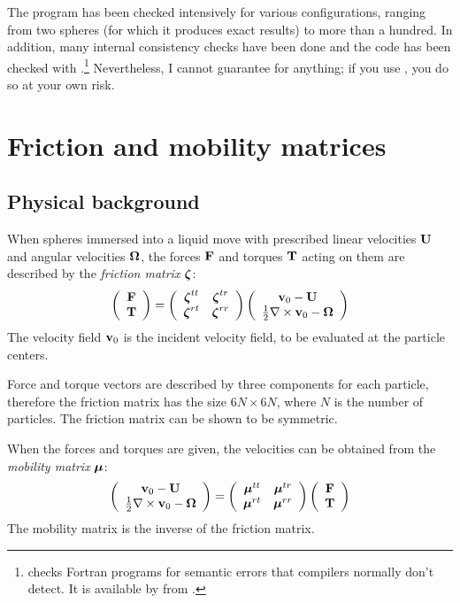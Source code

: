 The program has been checked intensively for various configurations,
ranging from two spheres (for which it produces exact results) to more
than a hundred. In addition, many internal consistency checks have
been done and the code has been checked with
.\footnote{ checks Fortran programs for
semantic errors that compilers normally don't detect. It is available
by  from .} Nevertheless, I cannot
guarantee for anything; if you use , you do so at your
own risk.


\section{Friction and mobility matrices}

\subsection{Physical background}

When spheres immersed into a liquid move with prescribed linear
velocities ${\bf U}$ and angular velocities $\mbox{\boldmath $\Omega$}$, the
forces ${\bf F}$ and torques ${\bf T}$ acting on them are described
by the {\em friction matrix} $\mbox{\boldmath $\zeta$}$:
\[
\left(\begin{array}{c} {\bf F}\\ {\bf T} \end{array}\right) = 
\left(\begin{array}{cc}
\mbox{\boldmath $\zeta$}^{tt} & \mbox{\boldmath $\zeta$}^{tr} \\
\mbox{\boldmath $\zeta$}^{rt} & \mbox{\boldmath $\zeta$}^{rr}
\end{array}\right) \left(\begin{array}{c}
{\bf v}_0-{\bf U}\\ \frac{1}{2}\nabla\times{\bf v}_0-\mbox{\boldmath $\Omega$}
\end{array}\right)
\]
The velocity field ${\bf v}_0$ is the incident velocity field, to be
evaluated at the particle centers.

Force and torque vectors are described by three components for each
particle, therefore the friction matrix has the size $6N\times 6N$,
where $N$ is the number of particles. The friction matrix can be shown
to be symmetric.

When the forces and torques are given, the velocities can be obtained
from the
{\em mobility matrix} $\mbox{\boldmath $\mu$}$:
\[
\left(\begin{array}{c}
{\bf v}_0-{\bf U}\\ \frac{1}{2}\nabla\times{\bf v}_0-\mbox{\boldmath $\Omega$}
\end{array}\right) = 
\left(\begin{array}{cc}
\mbox{\boldmath $\mu$}^{tt} & \mbox{\boldmath $\mu$}^{tr} \\
\mbox{\boldmath $\mu$}^{rt} & \mbox{\boldmath $\mu$}^{rr}
\end{array}\right) \left(\begin{array}{c}
{\bf F}\\ {\bf T}
\end{array}\right)
\]
The mobility matrix is the inverse of the friction matrix.

